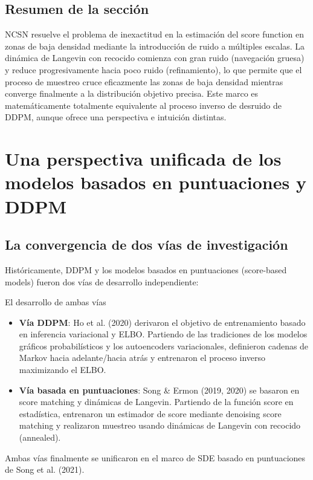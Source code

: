 \documentclass[a4paper]{article}
\begin{document}
\subsection{Resumen de la sección}

NCSN resuelve el problema de inexactitud en la estimación del score function en zonas de baja densidad mediante la introducción de ruido a múltiples escalas. La dinámica de Langevin con recocido comienza con gran ruido (navegación gruesa) y reduce progresivamente hacia poco ruido (refinamiento), lo que permite que el proceso de muestreo cruce eficazmente las zonas de baja densidad mientras converge finalmente a la distribución objetivo precisa. Este marco es matemáticamente totalmente equivalente al proceso inverso de desruido de DDPM, aunque ofrece una perspectiva e intuición distintas.
\section{Una perspectiva unificada de los modelos basados en puntuaciones y DDPM}

\subsection{La convergencia de dos vías de investigación}

Históricamente, DDPM y los modelos basados en puntuaciones (score-based models) fueron dos vías de desarrollo independiente:

\begin{knowledgebox}{El desarrollo de ambas vías}
\begin{itemize}
    \item \textbf{Vía DDPM}: Ho et al. (2020) derivaron el objetivo de entrenamiento basado en inferencia variacional y ELBO. Partiendo de las tradiciones de los modelos gráficos probabilísticos y los autoencoders variacionales, definieron cadenas de Markov hacia adelante/hacia atrás y entrenaron el proceso inverso maximizando el ELBO.
    \item \textbf{Vía basada en puntuaciones}: Song \& Ermon (2019, 2020) se basaron en score matching y dinámicas de Langevin. Partiendo de la función score en estadística, entrenaron un estimador de score mediante denoising score matching y realizaron muestreo usando dinámicas de Langevin con recocido (annealed).
\end{itemize}
Ambas vías finalmente se unificaron en el marco de SDE basado en puntuaciones de Song et al. (2021).
\end{knowledgebox}
\end{document}
